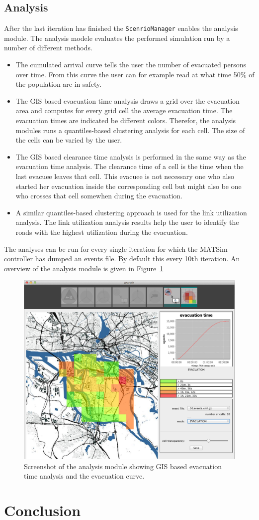 \subsection{Analysis}
After the last iteration has finished the \verb+ScenrioManager+ enables the analysis module. The analysis modele evaluates the performed simulation run by a number of different methods. 
\begin{itemize}
\item The cumulated arrival curve tells the user the number of evacuated persons over time. From this curve the user can for example read at what time 50\% of the population are in safety.
\item The GIS based evacuation time analysis draws a grid over the evacuation area and computes for every grid cell the average evacuation time. The evacuation times are indicated be different colors. Therefor, the analysis modules runs a quantiles-based clustering analysis for each cell. The size of the cells can be varied  by the user.
\item The GIS based clearance time analysis is performed in the same way as the evacuation time  analysis. The clearance time of a cell is the time when the last evacuee leaves that cell. This evacuee is not necessary one who also started her evacuation inside the corresponding cell but might also be one who crosses that cell somewhen during the evacuation.
\item A similar quantiles-based clustering approach is used for the link utilization analysis. The link utilization analysis results help the user to identify the roads with the highest utilization during the evacuation.
\end{itemize}
The analyses can be run for every single iteration for which the MATSim controller has dumped an events file. By default this every 10th iteration. An overview of the analysis module is given in Figure~\ref{chap:evac:fig:analysis}
\begin{figure}
\includegraphics[width=1\textwidth]{extending/figures/Evacuation/it50_evac_time}
\caption{Screenshot of the analysis module showing GIS based evacuation time analysis and the evacuation curve.}\label{chap:evac:fig:analysis}
\end{figure}

\section{Conclusion}\label{grips:outlook}
